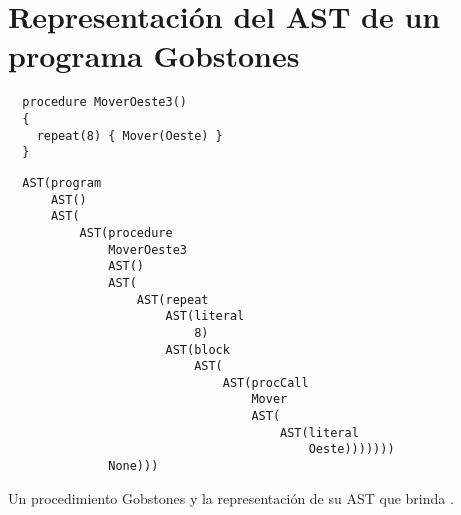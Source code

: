 \section{Representación del AST de un programa Gobstones}
\label{app:ASTGobstones}

\begin{listing}
  \begin{verbatim}
  procedure MoverOeste3()
  {
    repeat(8) { Mover(Oeste) }
  }
  \end{verbatim}

  \begin{verbatim}
  AST(program
      AST()
      AST(
          AST(procedure
              MoverOeste3
              AST()
              AST(
                  AST(repeat
                      AST(literal
                          8)
                      AST(block
                          AST(
                              AST(procCall
                                  Mover
                                  AST(
                                      AST(literal
                                          Oeste)))))))
              None)))
  \end{verbatim}

  \caption{Un procedimiento Gobstones y la representación de su AST que brinda \pyGob.}
  \label{lst:ASTGobstones}
\end{listing}
